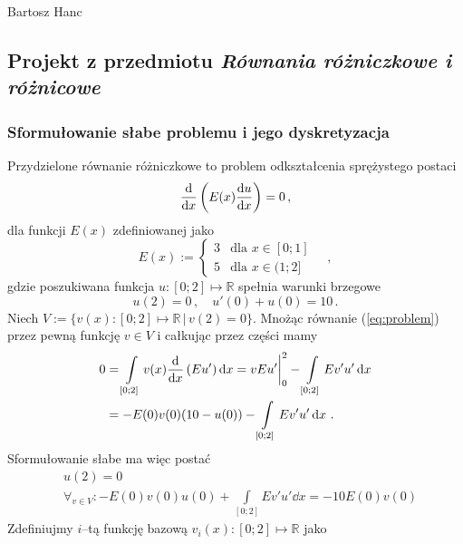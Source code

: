 \documentclass{myclass}
\begin{document}
\begin{flushright}
    Bartosz Hanc
\end{flushright}

\subsection*{Projekt z przedmiotu \textit{Równania różniczkowe i różnicowe}}

\subsubsection*{Sformułowanie słabe problemu i jego dyskretyzacja}
Przydzielone równanie różniczkowe to problem odkształcenia sprężystego postaci
\begin{equation}\label{eq:problem}
    \dv{}{x}\left(E(x)\dv{u}{x}\right) = 0\,,
\end{equation}
dla funkcji \(E(x)\) zdefiniowanej jako
\begin{equation}
    E(x) := \begin{cases}
        3&\text{dla \(x\in[0;1]\)}\\
        5&\text{dla \(x\in(1;2]\)}
    \end{cases}\quad,
\end{equation}
gdzie poszukiwana funkcja \(u:[0;2]\mapsto\mathbb{R}\) spełnia warunki brzegowe
\begin{equation}
    u(2) = 0\,,\quad u'(0)+u(0) = 10\,.
\end{equation}
Niech \(V := \{v(x):[0;2]\mapsto\mathbb{R}\, | \, v(2) = 0\}\). Mnożąc równanie
(\ref{eq:problem}) przez pewną funkcję \(v\in V\) i całkując przez części mamy
\begin{equation}
    \begin{split}
        0 & = \int\limits_{[0;2]} v(x)\dv{}{x}\left(Eu'\right)\dd{x} =vEu'\bigg|_0^2 - \int\limits_{[0;2]} Ev'u'\dd{x} \\ 
        & = -E(0)v(0)(10-u(0)) - \int\limits_{[0;2]} Ev'u'\dd{x}\,.
    \end{split}
\end{equation}
Sformułowanie słabe ma więc postać
\begin{equation}\label{eq:weak}
    \begin{split}
        &u(2) = 0 \\
        &\forall_{v\in V}:-E(0)v(0)u(0) + \int\limits_{[0;2]} Ev'u'\dd{x} = -10E(0)v(0)
    \end{split}
\end{equation}
Zdefiniujmy \(i\)--tą funkcję bazową \(v_i(x):[0;2]\mapsto\mathbb{R}\) jako
\end{document}

